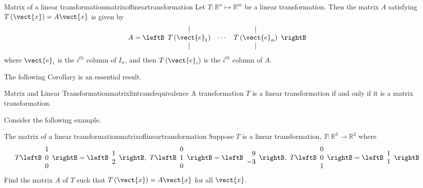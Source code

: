 \begin{theorem}{Matrix of a linear transformation}{matrixoflineartransformation}
Let $T: \mathbb{R}^{n} \mapsto \mathbb{R}^{m}$ be a linear transformation. Then the matrix $A$ satisfying $T\left(\vect{x}\right)=A\vect{x}$ is given by
\begin{equation*}
A=
\leftB
\begin{array}{ccc}
| &  & | \\
T\left( \vect{e}_{1}\right) & \cdots & T\left( \vect{e}_{n}\right) \\
| &  & |
\end{array}
\rightB
\end{equation*}
where $\vect{e}_{i}$ is the $i^{th}$ column of $I_n$, and then $T\left( \vect{e}_{i}
\right)$ is the $i^{th}$ column of $A.$
\end{theorem}

The following Corollary is an essential result.

\begin{corollary}{Matrix and Linear Transformation}{matrixlintransfequivalence}
A transformation $T$ is a linear transformation if and only if it is a matrix transformation. 
\end{corollary}

Consider the following example.

\begin{example}{The matrix of a linear transformation}{matrixoflineartransformation}
Suppose $T$ is a linear transformation, $T:\mathbb{R}^{3}\rightarrow \mathbb{
R}^{2}$ where 
\begin{equation*}
T\leftB
\begin{array}{r}
1 \\
0 \\
0
\end{array}
\rightB =\leftB
\begin{array}{r}
1 \\
2
\end{array}
\rightB ,\ T\leftB
\begin{array}{r}
0 \\
1 \\
0
\end{array}
\rightB =\leftB
\begin{array}{r}
9 \\
-3
\end{array}
\rightB ,\ T\leftB
\begin{array}{r}
0 \\
0 \\
1
\end{array}
\rightB =\leftB
\begin{array}{r}
1 \\
1
\end{array}
\rightB
\end{equation*}
Find the matrix $A$ of $T$ such that $T \left( \vect{x} \right)=A\vect{x}$  for all $\vect{x}$.
\end{example}


